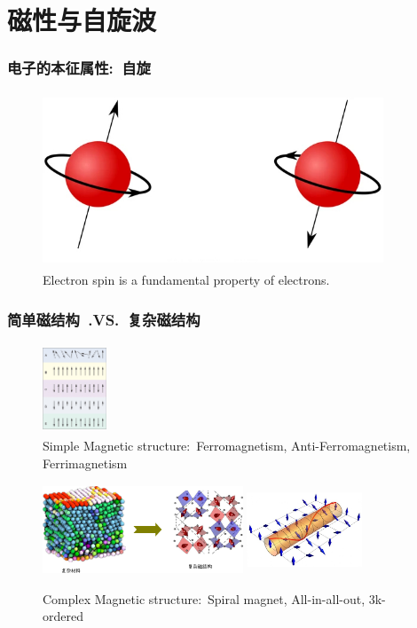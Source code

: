 \section{磁性与自旋波}
\frame
{
	\frametitle{电子的本征属性:~自旋}
\begin{figure}[h!]
\vspace*{-0.08in}
\centering
\includegraphics[height=2.05in,width=4.00in,viewport=0 0 580 290,clip]{Figures/electron-spin_2.jpeg}
\caption{\tiny \textrm{Electron spin is a fundamental property of electrons.}}%
\label{Fig:Electron-spin}
\end{figure}
}

\frame
{
	\frametitle{简单磁结构~\textrm{.VS.}~复杂磁结构}
\begin{figure}[h!]
\vspace*{-0.08in}
\centering
\includegraphics[height=1.05in,width=0.75in]{Figures/Magnet-simple.png}
\caption{\tiny \textrm{Simple Magnetic structure:~Ferromagnetism, Anti-Ferromagnetism, Ferrimagnetism}}%
\label{Fig:Simple-Magnet}
\end{figure}
\begin{figure}[h!]
\vspace*{-0.08in}
\centering
\includegraphics[height=1.05in,width=2.35in]{Figures/Magnet-complex-compound.png}
\hskip 0.5pt
\includegraphics[height=1.05in,width=1.35in]{Figures/Magnet-complex.png}
\caption{\tiny \textrm{Complex Magnetic structure:~Spiral magnet, All-in-all-out, 3k-ordered}}%
\label{Fig:Complex-Magnet}
\end{figure}
}

